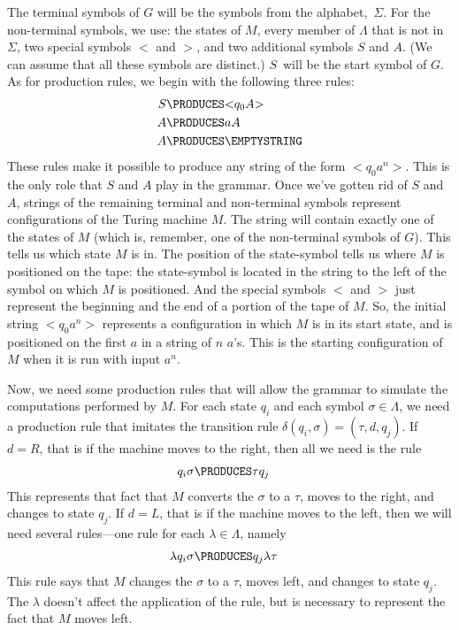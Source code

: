 The terminal symbols of $G$ will be the symbols from the alphabet,~$\Sigma$. 
For the non-terminal symbols,
we use: the states of $M$, every member of $\Lambda$ that is not
in $\Sigma$, two special symbols $<$ and $>$, and two additional
symbols $S$ and $A$.  (We can assume that all
these symbols are distinct.)  $S$~will be the start symbol of $G$.
As for production rules, we begin with the following three rules:
\begin{align*}
   S&\PRODUCES \hbox{$<$}q_0A\hbox{$>$}\\
   A&\PRODUCES aA\\
   A&\PRODUCES\EMPTYSTRING
\end{align*}
These rules make it possible to produce any string of the form
$<${}$q_0a^n${}$>$.  This is the only role that $S$ and $A$ play
in the grammar.  Once we've gotten rid of $S$ and $A$, strings
of the remaining terminal and non-terminal symbols represent
configurations of the Turing machine $M$.  The string will contain
exactly one of the states of $M$ (which is, remember, one of the
non-terminal symbols of $G$). This tells us which state $M$ is
in.  The position of the state-symbol tells us where
$M$ is positioned on the tape: the state-symbol is located
in the string to the left of the symbol on which $M$ is positioned.
And the special symbols $<$ and $>$ just represent
the beginning and the end of a portion of the tape of $M$.
So, the initial string $<${}$q_0a^n${}$>$ represents
a configuration in which $M$ is in its start state, and
is positioned on the first $a$ in a string of $n$ $a$'s.
This is the starting configuration of $M$ when it is run
with input $a^n$.

Now, we need some production
rules that will allow the grammar to simulate the computations
performed by $M$.  For each state $q_i$ and each symbol $\sigma\in\Lambda$,
we need a production rule that imitates the transition rule $\delta(q_i,\sigma)
=(\tau,d,q_j)$.  If $d=R$, that is if the machine moves to the right,
then all we need is the rule
\begin{align*}
   q_i\sigma&\PRODUCES \tau q_j
\end{align*}
This represents that fact that $M$ converts the $\sigma$ to a $\tau$,
moves to the right, and changes to state $q_j$.  If $d=L$, that is
if the machine moves to the left, then we will need several rules---one rule for
each $\lambda\in\Lambda$, namely
\begin{align*}
   \lambda q_i\sigma&\PRODUCES q_j\lambda\tau
\end{align*}
This rule says that $M$ changes the $\sigma$ to a $\tau$, moves left,
and changes to state $q_j$.  The $\lambda$ doesn't affect the
application of the rule, but is necessary to represent the fact
that $M$ moves left.

